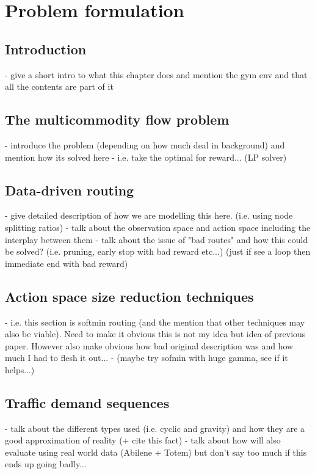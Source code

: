 \chapter{Problem formulation}
\label{chapter:problem}

\section{Introduction}
- give a short intro to what this chapter does and mention the gym env and that all the contents are part of it

\section{The multicommodity flow problem}
 - introduce the problem (depending on how much deal in background) and mention how its solved here
 - i.e. take the optimal for reward... (LP solver)

\section{Data-driven routing}
- give detailed description of how we are modelling this here. (i.e. using node splitting ratios)
- talk about the observation space and action space including the interplay between them
- talk about the issue of "bad routes" and how this could be solved? (i.e. pruning, early stop with bad reward etc...) (just if see a loop then immediate end with bad reward)

\section{Action space size reduction techniques}
- i.e. this section is softmin routing (and the mention that other techniques may also be viable). Need to make it obvious this is not my idea but idea of previous paper. However also make obvious how bad original description was and how much I had to flesh it out...
- (maybe try sofmin with huge gamma, see if it helps...)

\section{Traffic demand sequences}
- talk about the different types used (i.e. cyclic and gravity) and how they are a good approximation of reality (+ cite this fact)
- talk about how will also evaluate using real world data (Abilene + Totem) but don't say too much if this ends up going badly...
